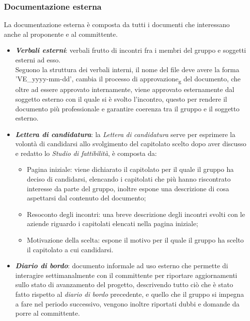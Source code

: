         \subsubsection{Documentazione esterna}
        La documentazione esterna è composta da tutti i documenti che interessano anche al proponente e al committente.
        \begin{itemize}
            \item \textit{\textbf{Verbali esterni}}: verbali frutto di incontri fra i membri del gruppo e soggetti esterni ad esso.\\
            Seguono la struttura dei verbali interni, il nome del file deve avere la forma 'VE\_yyyy-mm-dd', cambia il processo di approvazione\textsubscript{g} del documento, che oltre ad essere approvato internamente, viene approvato esternamente dal soggetto esterno con il quale 
            si è svolto l'incontro, questo per rendere il documento più professionale e garantire coerenza tra il gruppo e il soggetto esterno.
            \item \textit{\textbf{Lettera di candidatura}}: la \textit{Lettera di candidatura} serve per esprimere la volontà di candidarsi allo svolgimento del capitolato scelto dopo aver discusso e redatto lo \textit{Studio di fattibilità}, 
            è composta da:
            \begin{itemize}
                \item Pagina iniziale: viene dichiarato il capitolato per il quale il gruppo ha deciso di candidarsi, elencando i capitolati che più hanno riscontrato interesse da parte del gruppo, 
                inoltre espone una descrizione di cosa aspettarsi dal contenuto del documento;
                \item Resoconto degli incontri: una breve descrizione degli incontri svolti con le aziende riguardo i capitolati elencati nella pagina iniziale;
                \item Motivazione della scelta: espone il motivo per il quale il gruppo ha scelto il capitolato a cui candidarsi.
            \end{itemize}
            \item \textit{\textbf{Diario di bordo}}: documento informale ad uso esterno che permette di interagire settimanalmente con il committente per riportare aggiornamenti sullo stato di avanzamento del progetto, descrivendo tutto ciò che è stato fatto rispetto al \textit{diario di bordo} precedente, 
            e quello che il gruppo si impegna a fare nel periodo successivo, vengono inoltre riportati dubbi e domande da porre al committente.

\end{itemize}
